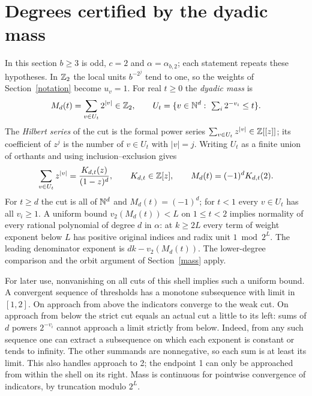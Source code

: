 \documentclass[11pt]{article}
\begin{document}
\section{Degrees certified by the dyadic mass}\label{certs}
In this section \(b\ge3\) is odd, \(c=2\) and \(\alpha=\alpha_{b,2}\);
each statement repeats these hypotheses. In \(\mathbb Z_2\) the local units
\(b^{-2^j}\) tend to one, so the weights of Section~\ref{notation} become
\(u_v=1\). For real \(t\ge0\) the \emph{dyadic mass} is
\[
 M_d(t)=\sum_{v\in U_t}2^{|v|}\in\mathbb Z_2,\qquad
 U_t=\{v\in\mathbb N^d:\ \textstyle\sum_i2^{-v_i}\le t\}.
\]
The \emph{Hilbert series} of the cut is the formal power series
\(\sum_{v\in U_t}z^{|v|}\in\mathbb Z[[z]]\); its coefficient of \(z^j\) is the
number of \(v\in U_t\) with \(|v|=j\). Writing \(U_t\) as a finite union of
orthants and using inclusion--exclusion gives
\[
 \sum_{v\in U_t}z^{|v|}=\frac{K_{d,t}(z)}{(1-z)^d},
 \qquad K_{d,t}\in\mathbb Z[z],\qquad M_d(t)=(-1)^d K_{d,t}(2).
\]
For \(t\ge d\) the cut is all of \(\mathbb N^d\) and \(M_d(t)=(-1)^d\); for
\(t<1\) every \(v\in U_t\) has all \(v_i\ge1\). A uniform bound
\(v_2(M_d(t))<L\) on \(1\le t<2\) implies normality of every rational
polynomial of degree \(d\) in \(\alpha\):
at \(k\ge2L\) every term of weight exponent below \(L\) has positive
original indices and radix unit \(1\bmod2^L\). The leading denominator
exponent is \(dk-v_2(M_d(t))\). The lower-degree comparison and the orbit
argument of Section~\ref{mass} apply.

For later use, nonvanishing on all cuts of this shell implies such a
uniform bound. A convergent sequence of thresholds has a monotone
subsequence with limit in \([1,2]\). On approach from above the indicators
converge to the weak cut. On approach from below the strict cut equals an
actual cut a little to its left: sums of \(d\) powers \(2^{-v_i}\) cannot
approach a limit strictly from below. Indeed, from any such sequence one
can extract a subsequence on which each exponent is constant or tends to
infinity. The other summands are nonnegative, so each sum is at least
its limit. This also handles approach to 2; the endpoint 1 can only be
approached from within the shell on its right. Mass is continuous for
pointwise convergence of indicators, by truncation modulo \(2^L\).
\end{document}
